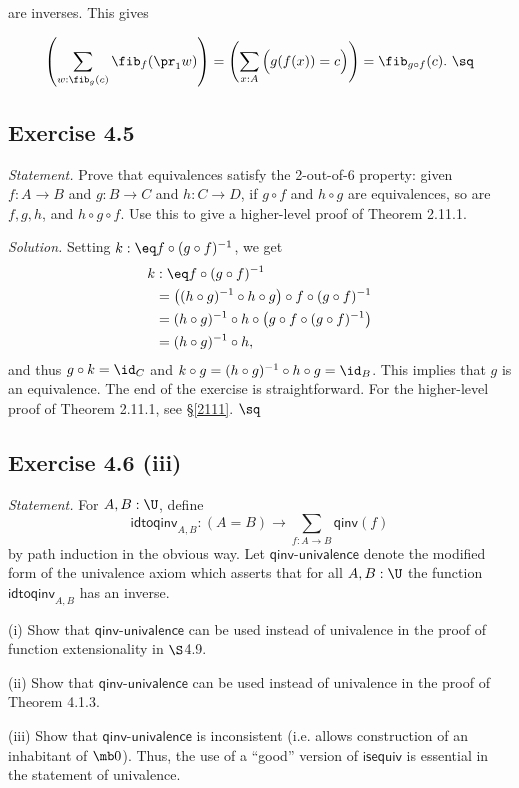 \documentclass[12pt]{article}
\begin{document}
\nn are inverses. This gives 

$$\left(\sum_{w:\fib_g(c)}\fib_f(\pr_1w)\right)=\left(\sum_{x:A}\Big(g(f(x))=c\Big)\right)=\fib_{g\circ f}(c).\ \sq$$


\subsection{Exercise 4.5}\label{45}

\emph{Statement.} Prove that equivalences satisfy the 2-out-of-6 property: given $f:A\to B$ and $g:B\to C$ and $h:C\to D$, if $g\circ f$ and $h\circ g$ are equivalences, so are $f,g,h$, and $h\circ g\circ f$. Use this to give a higher-level proof of Theorem 2.11.1.

\nn\emph{Solution.} Setting $k:\eq f\circ (g\circ f)^{-1}$, we get 
\begin{align*}
k&:\eq f\circ (g\circ f)^{-1}\\
&=\big((h\circ g)^{-1}\circ h\circ g\big)\circ f\circ (g\circ f)^{-1}\\
&=(h\circ g)^{-1}\circ h\circ\big(g\circ f\circ (g\circ f)^{-1}\big)\\
&=(h\circ g)^{-1}\circ h,
\end{align*}
and thus $g\circ k=\id_C$ and $k\circ g=(h\circ g)^{-1}\circ h\circ g=\id_B$. This implies that $g$ is an equivalence. The end of the exercise is straightforward. For the higher-level proof of Theorem 2.11.1, see \S\ref{2111}. $\sq$


\subsection{Exercise 4.6 (iii)}

\emph{Statement.} For $A,B:\U$, define
$$
\mathsf{idtoqinv}_{A,B}:(A=B)\to\sum_{f:A\to B}\mathsf{qinv}(f)
$$
by path induction in the obvious way. Let $\mathsf{qinv}$-$\mathsf{univalence}$ denote the modified form of the univalence axiom which asserts that for all $A,B:\U$ the function $\mathsf{idtoqinv}_{A,B}$ has an inverse.

\nn(i) Show that $\mathsf{qinv}$-$\mathsf{univalence}$ can be used instead of univalence in the proof of function extensionality in $\S$4.9.

\nn(ii) Show that $\mathsf{qinv}$-$\mathsf{univalence}$ can be used instead of univalence in the proof of Theorem 4.1.3.

\nn(iii) Show that $\mathsf{qinv}$-$\mathsf{univalence}$ is inconsistent (i.e. allows construction of an inhabitant of $\mb0$). Thus, the use of a ``good'' version of $\mathsf{isequiv}$ is essential in the statement of univalence.
\end{document}
